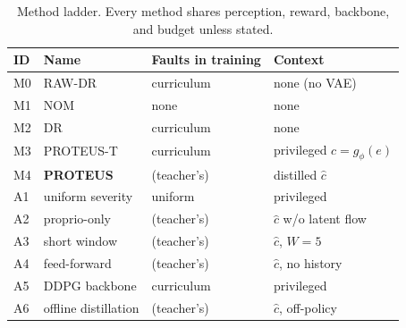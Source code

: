 \documentclass[journal]{IEEEtran}
\newcommand{\ehat}{\hat{c}}
\begin{document}
\begin{table}[!t]
\centering
\caption{Method ladder. Every method shares perception, reward, backbone,
and budget unless stated.}
\label{tab:ladder}
\footnotesize
\setlength{\tabcolsep}{3.5pt}
\begin{tabular}{llll}
\toprule
ID & Name & Faults in training & Context \\
\midrule
M0 & RAW-DR & curriculum & none (no VAE) \\
M1 & NOM & none & none \\
M2 & DR & curriculum & none \\
M3 & PROTEUS-T & curriculum & privileged $c{=}g_\phi(e)$ \\
M4 & \textbf{PROTEUS} & (teacher's) & distilled $\ehat$ \\
\midrule
A1 & uniform severity & uniform & privileged \\
A2 & proprio-only & (teacher's) & $\ehat$ w/o latent flow \\
A3 & short window & (teacher's) & $\ehat$, $W{=}5$ \\
A4 & feed-forward & (teacher's) & $\ehat$, no history \\
A5 & DDPG backbone & curriculum & privileged \\
A6 & offline distillation & (teacher's) & $\ehat$, off-policy \\
\bottomrule
\end{tabular}
\end{table}
\end{document}
